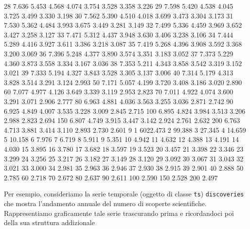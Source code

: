 \documentclass[onecolumn,12pt]{book}
\begin{document}
\begin{Schunk}
\begin{Soutput}
28     7.636    5.453    4.568    4.074    3.754    3.528    3.358    3.226
29     7.598    5.420    4.538    4.045    3.725    3.499    3.330    3.198
30     7.562    5.390    4.510    4.018    3.699    3.473    3.304    3.173
31     7.530    5.362    4.484    3.993    3.675    3.449    3.281    3.149
32     7.499    5.336    4.459    3.969    3.652    3.427    3.258    3.127
33     7.471    5.312    4.437    3.948    3.630    3.406    3.238    3.106
34     7.444    5.289    4.416    3.927    3.611    3.386    3.218    3.087
35     7.419    5.268    4.396    3.908    3.592    3.368    3.200    3.069
36     7.396    5.248    4.377    3.890    3.574    3.351    3.183    3.052
37     7.373    5.229    4.360    3.873    3.558    3.334    3.167    3.036
38     7.353    5.211    4.343    3.858    3.542    3.319    3.152    3.021
39     7.333    5.194    4.327    3.843    3.528    3.305    3.137    3.006
40     7.314    5.179    4.313    3.828    3.514    3.291    3.124    2.993
50     7.171    5.057    4.199    3.720    3.408    3.186    3.020    2.890
60     7.077    4.977    4.126    3.649    3.339    3.119    2.953    2.823
70     7.011    4.922    4.074    3.600    3.291    3.071    2.906    2.777
80     6.963    4.881    4.036    3.563    3.255    3.036    2.871    2.742
90     6.925    4.849    4.007    3.535    3.228    3.009    2.845    2.715
100    6.895    4.824    3.984    3.513    3.206    2.988    2.823    2.694
150    6.807    4.749    3.915    3.447    3.142    2.924    2.761    2.632
200    6.763    4.713    3.881    3.414    3.110    2.893    2.730    2.601
           9
1   6022.473
2     99.388
3     27.345
4     14.659
5     10.158
6      7.976
7      6.719
8      5.911
9      5.351
10     4.942
11     4.632
12     4.388
13     4.191
14     4.030
15     3.895
16     3.780
17     3.682
18     3.597
19     3.523
20     3.457
21     3.398
22     3.346
23     3.299
24     3.256
25     3.217
26     3.182
27     3.149
28     3.120
29     3.092
30     3.067
31     3.043
32     3.021
33     3.000
34     2.981
35     2.963
36     2.946
37     2.930
38     2.915
39     2.901
40     2.888
50     2.785
60     2.718
70     2.672
80     2.637
90     2.611
100    2.590
150    2.528
200    2.497
\end{Soutput}
\end{Schunk}
\vfill
\eject

% 

Per esempio, consideriamo la serie temporale (oggetto di classe \texttt{ts}) \texttt{discoveries} che mostra l'andamento annuale del numero di scoperte scientifiche. Rappresentiamo graficamente tale serie trascurando  prima e ricordandoci poi della sua struttura  addizionale
\printindex
\vfill\eject
\thispagestyle{empty}\cleardoublepage
%


\end{document}

